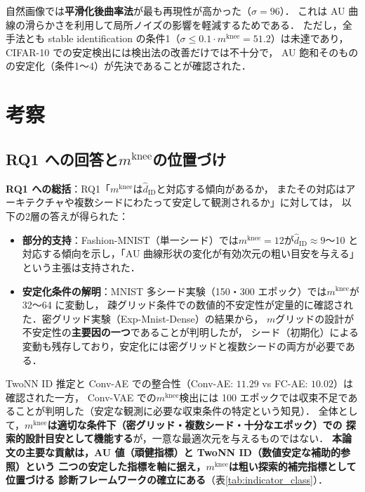 \documentclass[11pt,a4paper]{jsarticle}
\newcommand{\mknee}{m^{\mathrm{knee}}}
\begin{document}
自然画像では\textbf{平滑化後曲率法}が最も再現性が高かった（$\sigma=96$）．
これは AU 曲線の滑らかさを利用して局所ノイズの影響を軽減するためである．
ただし，全手法とも stable identification の条件1（$\sigma \leq 0.1 \cdot \mknee = 51.2$）は未達であり，
CIFAR-10 での安定検出には検出法の改善だけでは不十分で，
AU 飽和そのものの安定化（条件1〜4）が先決であることが確認された．

\section{考察}\label{sec:discussion}

\subsection{RQ1 への回答と$\mknee$の位置づけ}\label{sec:disc_mknee}

\textbf{RQ1 への総括}：RQ1「$\mknee$は$\hat{d}_\mathrm{ID}$と対応する傾向があるか，
またその対応はアーキテクチャや複数シードにわたって安定して観測されるか」に対しては，
以下の2層の答えが得られた：

\begin{itemize}
  \item \textbf{部分的支持}：Fashion-MNIST（単一シード）では$\mknee = 12$が$\hat{d}_\mathrm{ID} \approx 9$〜10
        と対応する傾向を示し，「AU 曲線形状の変化が有効次元の粗い目安を与える」という主張は支持された．
  \item \textbf{安定化条件の解明}：MNIST 多シード実験（150・300 エポック）では$\mknee$が 32〜64 に変動し，
        疎グリッド条件での数値的不安定性が定量的に確認された．密グリッド実験（Exp-Mnist-Dense）の結果から，
        $m$グリッドの設計が不安定性の\textbf{主要因の一つ}であることが判明したが，
        シード（初期化）による変動も残存しており，安定化には密グリッドと複数シードの両方が必要である．
\end{itemize}

TwoNN ID 推定と Conv-AE での整合性（Conv-AE: $11.29$ vs FC-AE: $10.02$）は確認された一方，
Conv-VAE での$\mknee$検出には 100 エポックでは収束不足であることが判明した（安定な観測に必要な収束条件の特定という知見）．
全体として，\textbf{$\mknee$は適切な条件下（密グリッド・複数シード・十分なエポック）での
探索的設計目安として機能する}が，一意な最適次元を与えるものではない．
\textbf{本論文の主要な貢献は，AU 値（頑健指標）と TwoNN ID（数値安定な補助的参照）という
二つの安定した指標を軸に据え，$\mknee$は粗い探索的補完指標として位置づける
診断フレームワークの確立にある}（表\ref{tab:indicator_class}）．
\end{document}
